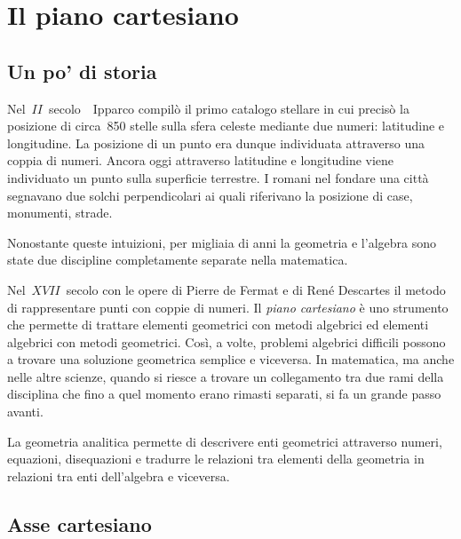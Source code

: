 


\chapter{Il piano cartesiano}

\section{Un po' di storia}
\label{sec:01_storia}

Nel~$II$~secolo~\aC\ Ipparco compilò il primo catalogo stellare in cui 
precisò la posizione di circa~850 stelle sulla sfera celeste mediante due 
numeri: latitudine e longitudine. La posizione di un punto era dunque 
individuata attraverso una coppia di numeri.
Ancora oggi attraverso latitudine e longitudine viene individuato un punto 
sulla superficie terrestre.
I romani nel fondare una città segnavano due solchi perpendicolari ai quali 
riferivano la posizione di case, monumenti, strade.

Nonostante queste intuizioni, per migliaia di anni la geometria e l'algebra 
sono state due discipline completamente separate nella matematica.

Nel~$XVII$~secolo con le opere di Pierre de Fermat e di René Descartes il 
metodo di rappresentare punti con coppie di numeri. 
Il \emph{piano cartesiano} è uno strumento che permette di trattare elementi 
geometrici con metodi algebrici ed elementi algebrici con metodi geometrici.
Così, a volte,  problemi algebrici difficili possono a trovare una soluzione 
geometrica semplice e viceversa.
In matematica, ma anche nelle altre scienze, quando si riesce a trovare un 
collegamento tra due rami della disciplina che fino a quel momento erano
rimasti separati, si fa un grande passo avanti.

La geometria analitica permette di descrivere enti geometrici attraverso 
numeri, equazioni, disequazioni e tradurre le relazioni tra elementi della 
geometria in relazioni tra enti dell'algebra e viceversa.

\section{Asse cartesiano}
\label{sec:02_asse}

